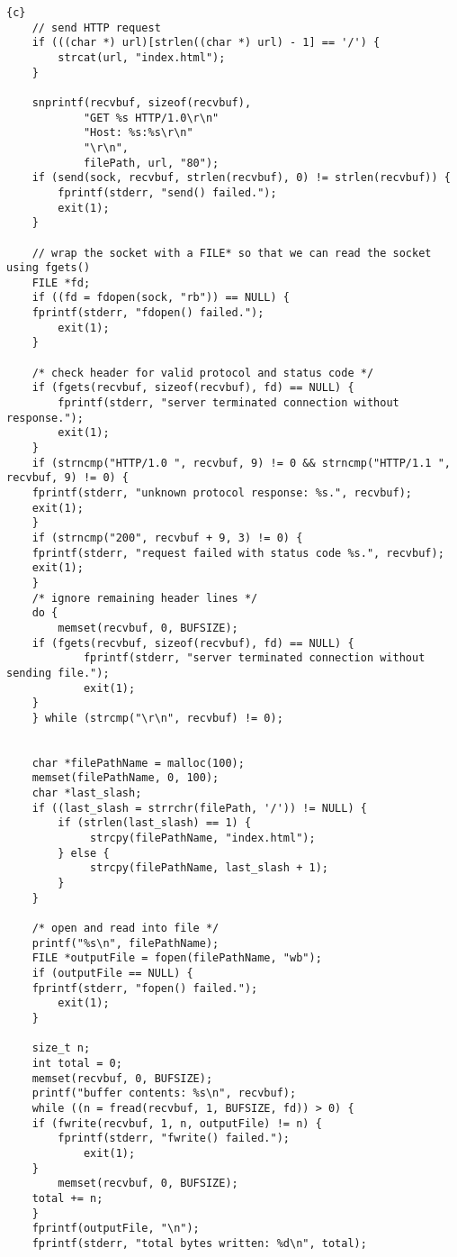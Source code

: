 \begin{lstlisting}{c}
    // send HTTP request
    if (((char *) url)[strlen((char *) url) - 1] == '/') {
        strcat(url, "index.html");
    }

    snprintf(recvbuf, sizeof(recvbuf), 
            "GET %s HTTP/1.0\r\n"
            "Host: %s:%s\r\n"
            "\r\n",
            filePath, url, "80");
    if (send(sock, recvbuf, strlen(recvbuf), 0) != strlen(recvbuf)) {
        fprintf(stderr, "send() failed.");
        exit(1);
    }

    // wrap the socket with a FILE* so that we can read the socket using fgets()
    FILE *fd;
    if ((fd = fdopen(sock, "rb")) == NULL) {
	fprintf(stderr, "fdopen() failed.");
        exit(1);
    }

    /* check header for valid protocol and status code */
    if (fgets(recvbuf, sizeof(recvbuf), fd) == NULL) {
        fprintf(stderr, "server terminated connection without response.");
        exit(1);
    } 
    if (strncmp("HTTP/1.0 ", recvbuf, 9) != 0 && strncmp("HTTP/1.1 ", recvbuf, 9) != 0) {
	fprintf(stderr, "unknown protocol response: %s.", recvbuf);
	exit(1);
    }
    if (strncmp("200", recvbuf + 9, 3) != 0) {
	fprintf(stderr, "request failed with status code %s.", recvbuf);
	exit(1);
    }
    /* ignore remaining header lines */
    do {
        memset(recvbuf, 0, BUFSIZE);
	if (fgets(recvbuf, sizeof(recvbuf), fd) == NULL) {
            fprintf(stderr, "server terminated connection without sending file.");
            exit(1);
	}
    } while (strcmp("\r\n", recvbuf) != 0);


    char *filePathName = malloc(100);
    memset(filePathName, 0, 100);
    char *last_slash;
    if ((last_slash = strrchr(filePath, '/')) != NULL) {
        if (strlen(last_slash) == 1) {
             strcpy(filePathName, "index.html");
        } else {
             strcpy(filePathName, last_slash + 1);
        }
    }
    
    /* open and read into file */
    printf("%s\n", filePathName);
    FILE *outputFile = fopen(filePathName, "wb");
    if (outputFile == NULL) {
	fprintf(stderr, "fopen() failed.");
        exit(1);
    }

    size_t n;
    int total = 0;
    memset(recvbuf, 0, BUFSIZE);
    printf("buffer contents: %s\n", recvbuf);
    while ((n = fread(recvbuf, 1, BUFSIZE, fd)) > 0) {
	if (fwrite(recvbuf, 1, n, outputFile) != n) {
	    fprintf(stderr, "fwrite() failed.");
            exit(1);
	}
        memset(recvbuf, 0, BUFSIZE);
	total += n;
    }
    fprintf(outputFile, "\n");
    fprintf(stderr, "total bytes written: %d\n", total);
    

\end{lstlisting}
